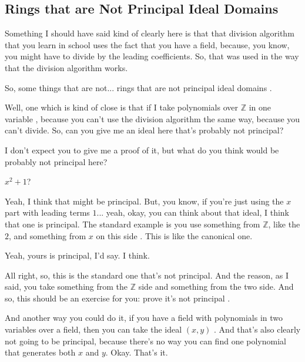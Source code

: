 \subsection{Rings that are Not Principal Ideal Domains}

\begin{speech}[00:41:37 - 00:41:50]
Something I should have said kind of clearly here is that that division algorithm that you learn in school uses the fact that you have a field, because, you know, you might have to divide by the leading coefficients. So, that was used in the way that the division algorithm works.

So, some things that are not... rings that are not principal ideal domains .

Well, one which is kind of close is that if I take polynomials over $\mathbb{Z}$ in one variable , because you can't use the division algorithm the same way, because you can't divide. So, can you give me an ideal here that's probably not principal?

I don't expect you to give me a proof of it, but what do you think would be probably not principal here?
\end{speech}

\begin{student}
$x^2 + 1$?
\end{student}

\begin{speech}[00:41:52 - 00:42:03]
Yeah, I think that might be principal. But, you know, if you're just using the $x$ part with leading terms $1$... yeah, okay, you can think about that ideal, I think that one is principal. The standard example is you use something from $\mathbb{Z}$, like the $2$, and something from $x$ on this side . This is like the canonical one.

Yeah, yours is principal, I'd say. I think.

All right, so, this is the standard one that's not principal. And the reason, as I said, you take something from the $\mathbb{Z}$ side and something from the two side. And so, this should be an exercise for you: prove it's not principal .

And another way you could do it, if you have a field with polynomials in two variables over a field, then you can take the ideal $(x, y)$  . And that's also clearly not going to be principal, because there's no way you can find one polynomial that generates both $x$ and $y$. Okay. That's it. 
\end{speech}

